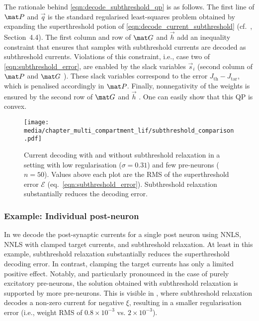 The rationale behind \cref{eqn:decode_subthreshold_qp} is as follows.
The first line of $\mat P$ and $\vec q$
is the standard regularised least-squares problem obtained by expanding the superthreshold potion of \cref{eqn:decode_current_subthreshold} (cf.~\cite{boyd2004convex}, Section~4.4).
The first column and row of $\mat G$ and $\vec h$
add an inequality constraint that ensures that samples with subthreshold currents are decoded as subthreshold currents.
Violations of this constraint, i.e., case two of \cref{eqn:subthreshold_error}, are enabled by the slack variables $\vec s_i$ (second column of $\mat P$ and $\mat G$%
).
These slack variables correspond to the error $J_\mathrm{th} - J_\mathrm{tar}$, which is penalised accordingly in $\mat P$.
Finally, nonnegativity of the weights is ensured by the second row of $\mat G$ and $\vec h$%
. One can easily show that this QP is convex.
\endgroup

\begin{figure}
	\texttt{[image: media/chapter\_multi\_compartment\_lif/subthreshold\_comparison.pdf]}%
	{\label{fig:subthreshold_comparison_a}}%
	{\label{fig:subthreshold_comparison_b}}%
	{\label{fig:subthreshold_comparison_c}}%
	{\label{fig:subthreshold_comparison_d}}%
	\caption[Current decoding with and without subthreshold relaxation]{Current decoding with and without subthreshold relaxation in a setting with low regularisation ($\sigma = 0.31$) and few pre-neurons ($n = 50$).
	Values above each plot are the RMS of the superthreshold error ${\mathcal{E}}$ (eq.~\ref{eqn:subthreshold_error}).
	Subthreshold relaxation substantially reduces the decoding error.	
	}
	\label{fig:subthreshold_comparison}
\end{figure}

\subsubsection{Example: Individual post-neuron}
In  we decode the post-synaptic currents for a single post neuron using NNLS, NNLS with clamped target currents, and subthreshold relaxation.
At least in this example, subthreshold relaxation substantially reduces the superthreshold decoding error.
In contrast, clamping the target currents has only a limited positive effect.
Notably, and particularly pronounced in the case of purely excitatory pre-neurons, the solution obtained with subthreshold relaxation is supported by more pre-neurons.
This is visible in , where subthreshold relaxation decodes a non-zero current for negative $\xi$, resulting in a smaller regularisation error (i.e., weight RMS of $0.8 \times 10^{-3}$ vs. $2 \times{10}^{-3}$).

